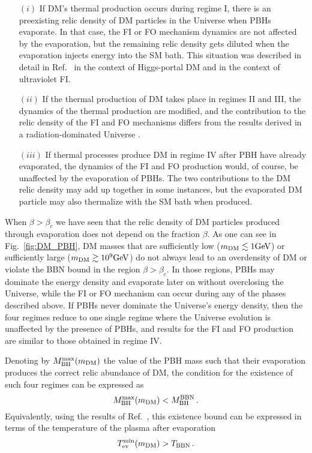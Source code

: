 \documentclass[aps,prd,reprint,twocolumn,preprintnumbers,floatfix,nofootinbib]{revtex4-1}
\newcommand{\be}{\begin{equation}}
\newcommand{\ee}{\end{equation}}
\newcommand{\mDM}{m_{\rm DM}}
\newcommand{\MBH}{M_{\rm BH}}
\begin{document}
\begin{itemize}
 \item [$(i)$] If DM's thermal production occurs during regime I, there is an preexisting relic density of DM particles in the Universe when PBHs evaporate. In that case, the FI or FO mechanism dynamics are not affected by the evaporation, but the remaining relic density gets diluted when the evaporation injects energy into the SM bath. This situation was described in detail in Ref.~\cite{Bernal:2020bjf} in the context of Higgs-portal DM and \cite{Bernal:2020ili} in the context of ultraviolet FI.
  
 \item [$(ii)$] If the thermal production of DM takes place in regimes II and III, the dynamics of the thermal production are modified, and the contribution to the relic density of the FI and FO mechanisms differs from the results derived in a radiation-dominated Universe \cite{Hamdan:2017psw, Arias:2019uol}.
  
 \item[$(iii)$] If thermal processes produce DM in regime IV after PBH have already evaporated, the dynamics of the FI and FO production would, of course, be unaffected by the evaporation of PBHs. The two contributions to the DM relic density may add up together in some instances, but the evaporated  DM particle may also thermalize with the SM bath when produced. 
\end{itemize}

When $\beta>\beta_c$ we have seen that the relic density of DM particles produced through evaporation does not depend on the fraction $\beta$. As one can see in Fig.~\ref{fig:DM_PBH}, DM masses that are sufficiently low ($\mDM\lesssim 1\mathrm{GeV}$) or sufficiently large ($\mDM\gtrsim 10^9\mathrm{GeV}$) do not always lead to an overdensity of DM or violate the BBN bound in the region $\beta>\beta_c$. In those regions, PBHs may dominate the energy density and evaporate later on without overclosing the Universe, while the FI or FO mechanism can occur during any of the phases described above. If PBHs never dominate the Universe's energy density, then the four regimes reduce to one single regime where the Universe evolution is unaffected by the presence of PBHs, and results for the FI and FO production are similar to those obtained in regime IV.

Denoting by $\MBH^{\rm max}(\mDM)$ the value of the PBH mass such that their evaporation produces the correct relic abundance of DM, the condition for the existence of such four regimes can be expressed as
\be
\MBH^{\rm max}(\mDM) < \MBH^{\rm BBN}\,.
\ee
Equivalently, using the results of Ref.~\cite{Gondolo:2020uqv}, this existence bound can be expressed in terms of the temperature of the plasma after evaporation
\be
T_{\rm ev}^{\rm min}(\mDM)>T_{\rm BBN}\,.
\ee
\end{document}
